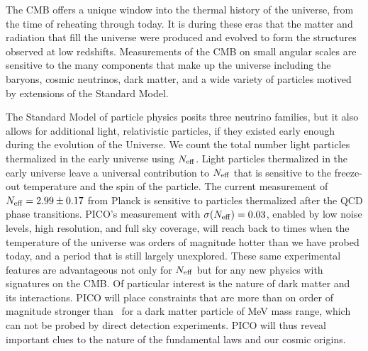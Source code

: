 \documentclass[PICOReport.tex]{subfiles}
\begin{document}

The CMB offers a unique window into the thermal history of the universe, from the time of reheating through today.  It is during these eras that the matter and radiation that fill the universe were produced and evolved to form the structures observed at low redshifts.  Measurements of the CMB on small angular scales are sensitive to the many components that make up the universe including the baryons, cosmic neutrinos, dark matter, and a wide variety of particles motived by extensions of the Standard Model.  

The Standard Model of particle physics posits three neutrino families, but it also allows for additional light, relativistic particles, if they existed early enough during the evolution of the Universe.   We count the total number light particles thermalized in the early universe using ${N_{\rm eff}}$. Light particles thermalized in the early universe leave a universal contribution to ${N_{\rm eff}}$ that is sensitive to the freeze-out temperature and the spin of the particle.  
The current measurement of ${N_{\rm eff}} = 2.99 \pm 0.17$  from Planck is sensitive to particles thermalized after the QCD phase transitions. PICO's measurement with $\sigma({N_{\rm eff}})=0.03$, enabled by low noise levels, high resolution, and full sky coverage, will reach back to times when the temperature of the universe was orders of magnitude hotter than we have probed today, and a period that is still largely unexplored.   
These same experimental features are advantageous not only for ${N_{\rm eff}}$ but for any new physics with signatures on the CMB. Of particular interest is the nature of dark matter and its interactions. PICO will place constraints that are more than on order of magnitude stronger than \planck\ for a dark matter particle of MeV mass range, which can not be probed by direct detection experiments. PICO will thus reveal important clues to the nature of the fundamental laws and our cosmic origins. 
\end{document}
